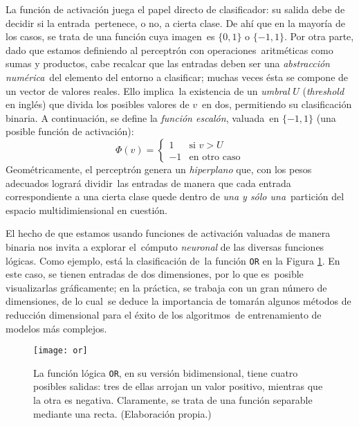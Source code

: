 La función de activación juega el papel directo de clasificador: su salida debe de decidir si la entrada\
pertenece, o no, a cierta clase. De ahí que en la mayoría de los casos, se trata de una función cuya imagen\
es $\{0,1\}$ o $\{-1,1\}$. Por otra parte, dado que estamos definiendo al perceptrón con operaciones\
aritméticas como sumas y productos, cabe recalcar que las entradas deben ser una \emph{abstracción numérica}\
del elemento del entorno a clasificar; muchas veces ésta se compone de un vector de valores reales. Ello implica\
la existencia de un \emph{umbral} $U$ (\emph{threshold} en inglés) que divida los posibles valores de $v$\
en dos, permitiendo su clasificación binaria. A continuación, se define la \emph{función escalón}, valuada\
en $\{-1,1\}$ (una posible función de activación):
\begin{equation}
  \Phi(v) =
  \begin{cases}
    1 & \text{si } v > U\\
    -1 & \text{en otro caso}
  \end{cases}
\end{equation}
Geométricamente, el perceptrón genera un \emph{hiperplano} que, con los pesos adecuados logrará dividir\
las entradas de manera que cada entrada correspondiente a una cierta clase quede dentro de \emph{una y sólo una}\
partición del espacio multidimiensional en cuestión.\par
El hecho de que estamos usando funciones de activación valuadas de manera binaria nos invita a explorar el\
cómputo \emph{neuronal} de las diversas funciones lógicas. Como ejemplo, está la clasificación de\
la función \verb+OR+ en la Figura \ref{or-fig}. En este caso, se tienen entradas de dos dimensiones, por lo que es\
posible visualizarlas gráficamente; en la práctica, se trabaja con un gran número de dimensiones, de lo cual\
se deduce la importancia de tomarán algunos métodos de reducción dimensional para el éxito de los algoritmos\
de entrenamiento de modelos más complejos.\par

\begin{figure}[H]
  \centering
  \texttt{[image: or]}
  \caption{La función lógica \texttt{OR}, en su versión bidimensional, tiene cuatro posibles salidas:
    tres de ellas arrojan un valor positivo, mientras que la otra es negativa. Claramente, se trata de una función
    separable mediante una recta.
    (Elaboración propia.)}
  \label{or-fig}
\end{figure}

